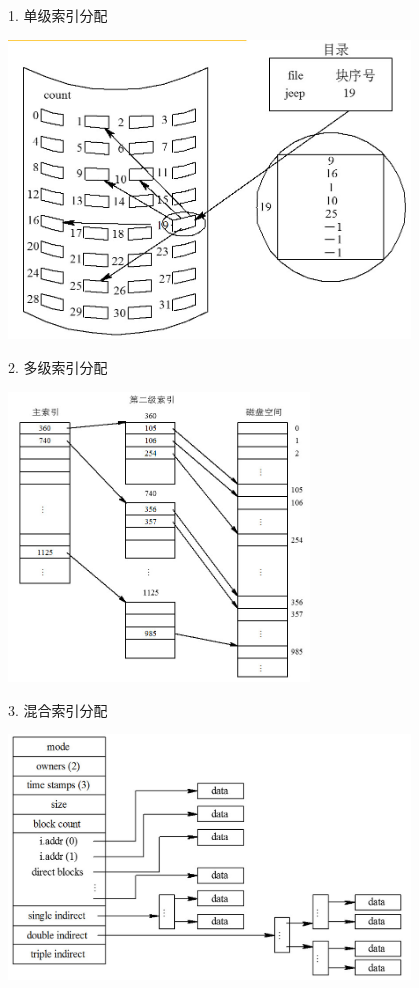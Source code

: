 \begin{frame}[fragile]{1. 单级索引分配}
  \begin{center}
    \includegraphics[width=0.8\textwidth]{figure/file/alloc-index.jpg}
  \end{center}
\end{frame}

\begin{frame}[fragile]{2. 多级索引分配}
  \begin{center}
    \includegraphics[width=0.6\textwidth]{figure/file/alloc-index2.jpg}
  \end{center}  
\end{frame}

\begin{frame}[fragile]{3. 混合索引分配}
  \begin{center}
    \includegraphics[width=0.8\textwidth]{figure/file/alloc-index3.jpg}
  \end{center}  
\end{frame}


